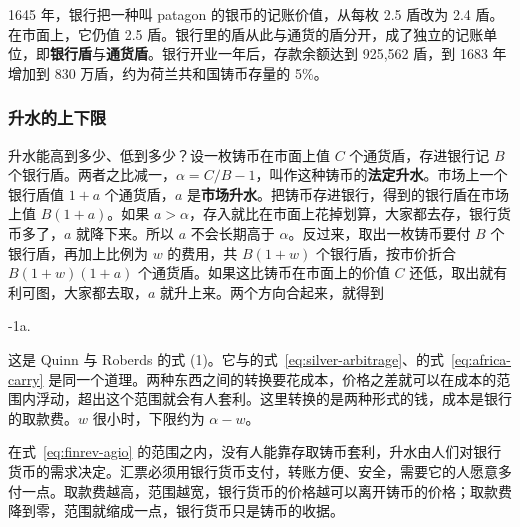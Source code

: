 1645 年，银行把一种叫 patagon 的银币的记账价值，从每枚 2.5 盾改为 2.4 盾。在市面上，它仍值 2.5 盾。银行里的盾从此与通货的盾分开，成了独立的记账单位，即\textbf{银行盾}与\textbf{通货盾}\cite{qr2010}。银行开业一年后，存款余额达到 925,562 盾，到 1683 年增加到 830 万盾，约为荷兰共和国铸币存量的 5\%\cite{qr2010}。

\subsubsection{升水的上下限}
升水能高到多少、低到多少？设一枚铸币在市面上值 $C$ 个通货盾，存进银行记 $B$ 个银行盾。两者之比减一，$\alpha=C/B-1$，叫作这种铸币的\textbf{法定升水}。市场上一个银行盾值 $1+a$ 个通货盾，$a$ 是\textbf{市场升水}。把铸币存进银行，得到的银行盾在市场上值 $B(1+a)$。如果 $a>\alpha$，存入就比在市面上花掉划算，大家都去存，银行货币多了，$a$ 就降下来。所以 $a$ 不会长期高于 $\alpha$。反过来，取出一枚铸币要付 $B$ 个银行盾，再加上比例为 $w$ 的费用，共 $B(1+w)$ 个银行盾，按市价折合 $B(1+w)(1+a)$ 个通货盾。如果这比铸币在市面上的价值 $C$ 还低，取出就有利可图，大家都去取，$a$ 就升上来。两个方向合起来，就得到
\begin{keyeq}
-1\;\le\;a\;\le\;\alpha .\label{eq:finrev-agio}
\end{keyeq}
这是 Quinn 与 Roberds 的式 (1)\cite{qr2010}。它与的式~\eqref{eq:silver-arbitrage}、的式~\eqref{eq:africa-carry} 是同一个道理。两种东西之间的转换要花成本，价格之差就可以在成本的范围内浮动，超出这个范围就会有人套利。这里转换的是两种形式的钱，成本是银行的取款费。$w$ 很小时，下限约为 $\alpha-w$。

\begin{intuition}[升水是银行货币的价格]
在式~\eqref{eq:finrev-agio} 的范围之内，没有人能靠存取铸币套利，升水由人们对银行货币的需求决定。汇票必须用银行货币支付，转账方便、安全，需要它的人愿意多付一点。取款费越高，范围越宽，银行货币的价格越可以离开铸币的价格；取款费降到零，范围就缩成一点，银行货币只是铸币的收据。
\end{intuition}

